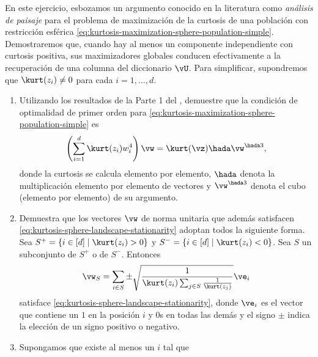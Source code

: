 \documentclass[../../book-main.tex]{subfiles}
\begin{document}
\begin{exercise}\label{exercise:kurtosis-sphere-landscape}
    En este ejercicio, esbozamos un argumento conocido en la
    literatura como \textit{análisis de paisaje} para el
    problema de maximización de la curtosis de una población con restricción esférica
    \eqref{eq:kurtosis-maximization-sphere-population-simple}. Demostraremos
    que, cuando hay al menos un componente independiente
    con curtosis positiva, sus maximizadores globales conducen efectivamente 
    a la recuperación de una columna del diccionario $\vU$.
    Para simplificar, supondremos que $\kurt(z_i) \neq 0$ para cada
    $i = 1, \dots, d$.
    \begin{enumerate}
        \item Utilizando los resultados de la Parte 1 del ,
            demuestre que la condición de optimalidad de primer orden para
            \eqref{eq:kurtosis-maximization-sphere-population-simple} es 
            \begin{equation}\label{eq:kurtosis-sphere-landscape-stationarity}
                \left(\sum_{i=1}^d \kurt(z_i) w_i^4 \right)
                \vw = \kurt(\vz) \hada \vw^{\hada 3},
            \end{equation}
            donde la curtosis se calcula elemento por elemento, $\hada$
            denota la multiplicación elemento por elemento de vectores y
            $\vw^{\hada 3}$ denota el cubo (elemento por elemento) de su argumento.
        \item Demuestra que los vectores $\vw$ de norma unitaria que además
            satisfacen \eqref{eq:kurtosis-sphere-landscape-stationarity}
            adoptan todos la siguiente forma.
            Sea $S^+ = \{i \in [d] \mid \kurt(z_i) > 0\}$ y
            $S^- = \{i \in [d] \mid \kurt(z_i) < 0\}$.
            Sea $S$ un subconjunto de $S^+$ o de $S^-$.
            Entonces 
            \begin{equation}\label{eq:kurtosis-sphere-landscape-cps}
                \vw_S = \sum_{i \in S} \pm \sqrt{\frac{1}{\kurt(z_i)
                \sum_{j \in S} \frac{1}{\kurt(z_j)}}} \ve_i
            \end{equation}
            satisface \eqref{eq:kurtosis-sphere-landscape-stationarity},
            donde $\ve_i$ es el vector que contiene un $1$ en la posición $i$
            y $0$s en todas las demás y el signo $\pm$ indica
            la elección de un signo positivo o negativo.
        \item Supongamos que existe al menos un $i$ tal que

\end{enumerate}
\end{exercise}
\end{document}
